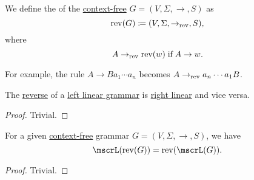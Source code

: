 \begin{definition}\label{def:reverse_grammar}
  We define the  of the \hyperref[def:chomsky_hierarchy/context_free]{context-free} \( G = (V, \Sigma, \to, S) \) as
  \begin{equation*}
    \operatorname{rev}(G) \coloneqq (V, \Sigma, \to_{\operatorname{rev}}, S),
  \end{equation*}
  where
  \begin{equation*}
    A \to_{\op{rev}} \op{rev}(w) \T{if} A \to w.
  \end{equation*}
\end{definition}
\begin{comments}
  \item For example, the rule \( A \to Ba_1 \cdots a_n \) becomes \( A \to_{\operatorname{rev}} a_n \cdots a_1 B \).
\end{comments}

\begin{proposition}\label{thm:reverse_linear_grammar}
  The \hyperref[def:reverse_grammar]{reverse} of a \hyperref[def:chomsky_hierarchy/regular]{left linear grammar} is \hyperref[def:chomsky_hierarchy/regular]{right linear} and vice versa.
\end{proposition}
\begin{proof}
  Trivial.
\end{proof}

\begin{proposition}\label{thm:reverse_grammar_language}
  For a given \hyperref[def:chomsky_hierarchy/context_free]{context-free} grammar \( G = (V, \Sigma, \to, S) \), we have
  \begin{equation*}
    \mscrL(\op{rev}(G)) = \op{rev}(\mscrL(G)).
  \end{equation*}
\end{proposition}
\begin{proof}
  Trivial.
\end{proof}

